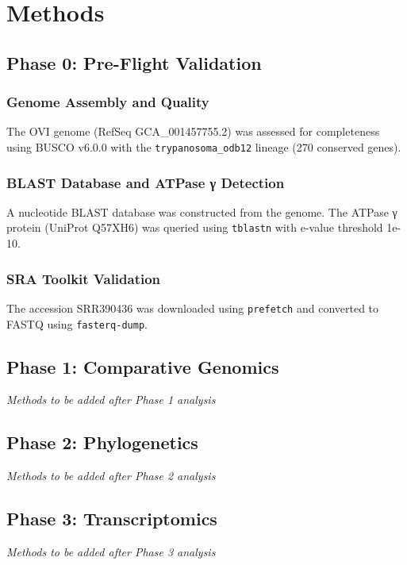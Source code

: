\chapter{Methods}

\section{Phase 0: Pre-Flight Validation}

\subsection{Genome Assembly and Quality}

The \teq{} OVI genome (RefSeq GCA\_001457755.2) was assessed for completeness using BUSCO v6.0.0 with the \texttt{trypanosoma\_odb12} lineage (270 conserved genes).

\subsection{BLAST Database and ATPase γ Detection}

A nucleotide BLAST database was constructed from the \teq{} genome. The \tbr{} ATPase γ protein (UniProt Q57XH6) was queried using \texttt{tblastn} with e-value threshold 1e-10.

\subsection{SRA Toolkit Validation}

The accession SRR390436 was downloaded using \texttt{prefetch} and converted to FASTQ using \texttt{fasterq-dump}.

\section{Phase 1: Comparative Genomics}

\textit{Methods to be added after Phase 1 analysis}

\section{Phase 2: Phylogenetics}

\textit{Methods to be added after Phase 2 analysis}

\section{Phase 3: Transcriptomics}

\textit{Methods to be added after Phase 3 analysis}

